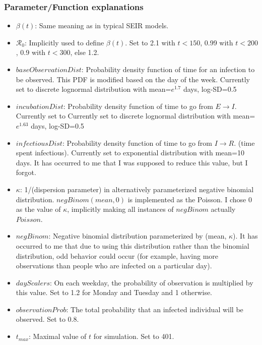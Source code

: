 \documentclass{article}
\newcommand{\nR}{\mathscr{R}}
\begin{document}
\subsubsection{Parameter/Function explanations}
\begin{itemize}
    \item $\beta(t)$: Same meaning as in typical SEIR models.
    \item $\nR_0$: Implicitly used to define $\beta(t)$. Set to 2.1 with $t < 150$, 0.99 with $t<200$, 0.9 with $t<300$, else 1.2.
    \item $baseObservationDist$: Probability density function of time for an infection to be observed. This PDF is modified based on the day of the week. Currently set to discrete lognormal distribution with mean=$e^{1.7}$ days, log-SD=0.5 
    \item $incubationDist$: Probability density function of time to go from $E \rightarrow I$. Currently set to Currently set to discrete lognormal distribution with mean=$e^{1.63}$ days, log-SD=0.5 
    \item $infectiousDist$: Probability density function of time to go from $I \rightarrow R$. (time spent infectious). Currently set to exponential distribution with mean=10 days. It has occurred to me that I was supposed to reduce this value, but I forgot.
    \item $\kappa$: 1/(dispersion parameter) in alternatively parameterized negative binomial distribution. \cite{NegBinom} $negBinom(mean, 0)$ is implemented as the Poisson. I chose 0 as the value of $\kappa$, implicitly making all instances of $negBinom$ actually $Poisson$.
    \item $negBinom$: Negative binomial distribution parameterized by (mean, $\kappa$). It has occurred to me that due to using this distribution rather than the binomial distribution, odd behavior could occur (for example, having more observations than people who are infected on a particular day).
    \item $dayScalers$: On each weekday, the probability of observation is multiplied by this value. Set to 1.2 for Monday and Tuesday and 1 otherwise. 
    \item $observationProb$: The total probability that an infected individual will be observed. Set to 0.8.
    \item $t_{max}$: Maximal value of $t$ for simulation. Set to 401.
\end{itemize}
\end{document}
